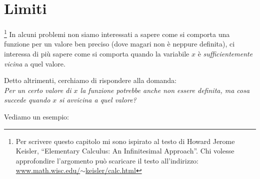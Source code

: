 \section{Limiti}
\label{sec:cont_limiti}

\footnote{Per scrivere questo capitolo mi sono ispirato 
al testo di Howard Jerome Keisler, 
``Elementary Calculus: An Infinitesimal Approach''. 
Chi volesse approfondire l'argomento può scaricare il testo all'indirizzo: 
\href{https://www.math.wisc.edu/~keisler/calc.html}
     {www.math.wisc.edu/\(\sim\)keisler/calc.html}}
In alcuni problemi non siamo interessati a sapere come si comporta una 
funzione per un valore ben preciso (dove magari non è neppure definita), ci 
interessa di più sapere come si comporta quando la variabile \(x\) è 
\emph{sufficientemente vicina} a quel valore.

Detto altrimenti, cerchiamo di rispondere alla domanda: \\
\emph{Per un certo valore di \(x\) la funzione potrebbe anche \emph{non} 
essere definita, ma cosa succede quando \(x\) si avvicina a quel valore?}

Vediamo un esempio:

